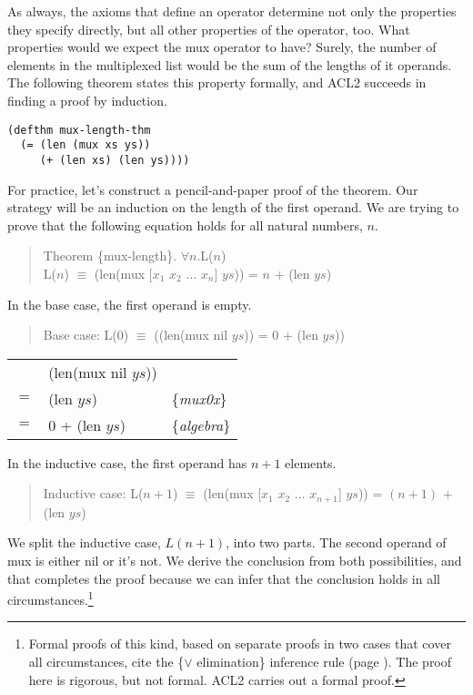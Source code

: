 As always, the axioms that define an operator
determine not only the properties they specify directly,
but all other properties of the operator, too.
What properties would we expect the mux operator to have?
Surely, the number of elements in the multiplexed list
would be the sum of the lengths of it operands.
The following theorem states this property formally,
and ACL2 succeeds in finding a proof by induction.

\label{mux-length-thm}
\begin{Verbatim}
(defthm mux-length-thm
  (= (len (mux xs ys))
     (+ (len xs) (len ys))))
\end{Verbatim}

For practice, let's construct a pencil-and-paper proof of the theorem.
Our strategy will be an induction on the length of the first operand.
We are trying to prove that the following equation holds for all natural numbers, $n$.
\begin{quote}
Theorem \{mux-length\}. $\forall n.$L($n$)\\
L($n$) $\equiv$ (len(mux [$x_1$ $x_2$ $\dots$ $x_n$] $ys$)) = $n$ + (len $ys$)
\end{quote}

In the base case, the first operand is empty.
\begin{quote}
Base case: L($0$) $\equiv$ ((len(mux nil $ys$)) = 0 + (len $ys$))
\end{quote}
\begin{center}
\begin{tabular}{lll}
     & (len(mux nil $ys$))    &                   \\
 $=$ & (len $ys$)             & \{\emph{mux0x}\}  \\
 $=$ & 0 + (len $ys$)         & \{\emph{algebra}\}\\
\end{tabular}
\end{center}

In the inductive case, the first operand has $n+1$ elements.
\begin{quote}
\label{mux-length-thm-induc-case}
Inductive case: L($n+1$) $\equiv$ (len(mux [$x_1$ $x_2$ $\dots$ $x_{n+1}$] $ys$)) = $(n+1)$ + (len $ys$)
\end{quote}

We split the inductive case, $L(n+1)$, into two parts.
The second operand of mux is either nil or it's not.
We derive the conclusion from both possibilities,
and that completes the proof because we can infer
that the conclusion holds in all
circumstances.\footnote{Formal proofs of this kind,
based on separate proofs in two cases that cover all circumstances,
cite the \{$\vee$ elimination\}
inference rule (page \pageref{fig-02-deduction-rules}).
The proof here is rigorous, but not formal.
ACL2 carries out a formal proof.}

